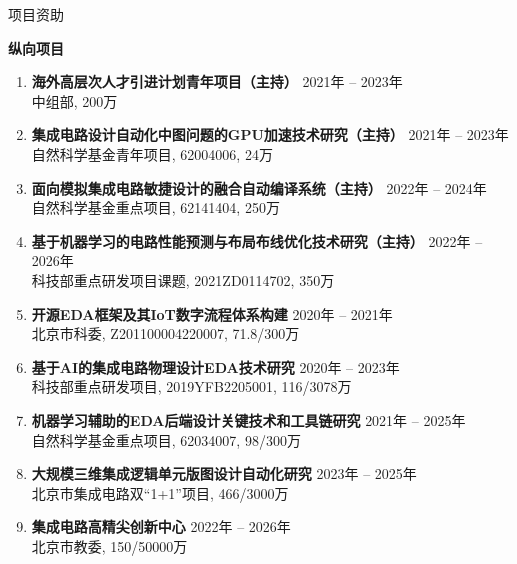 
\begin{rSection}{项目资助}


\textbf{纵向项目}
        
\begin{enumerate}[font=\normalfont]


\item
  {\bf 海外高层次人才引进计划青年项目（主持） }  \hfill{ 2021年 -- 2023年} \\
中组部, 200万

\item 
  {\bf 集成电路设计自动化中图问题的GPU加速技术研究（主持） } \hfill{ 2021年 -- 2023年} \\
自然科学基金青年项目, 62004006, 24万

\item 
{\bf 面向模拟集成电路敏捷设计的融合自动编译系统（主持） } \hfill{ 2022年 -- 2024年} \\
自然科学基金重点项目, 62141404, 250万

\item 
{\bf 基于机器学习的电路性能预测与布局布线优化技术研究（主持） } \hfill{ 2022年 -- 2026年} \\
科技部重点研发项目课题, 2021ZD0114702, 350万


\item 
{\bf 开源EDA框架及其IoT数字流程体系构建 } \hfill{ 2020年 -- 2021年} \\
北京市科委, Z201100004220007, 71.8/300万 %

\item 
{\bf 基于AI的集成电路物理设计EDA技术研究 } \hfill{ 2020年 -- 2023年} \\
科技部重点研发项目, 2019YFB2205001, 116/3078万 %

\item 
{\bf 机器学习辅助的EDA后端设计关键技术和工具链研究 } \hfill{ 2021年 -- 2025年} \\
自然科学基金重点项目, 62034007, 98/300万 %

\item 
{\bf 大规模三维集成逻辑单元版图设计自动化研究 } \hfill{ 2023年 -- 2025年} \\
北京市集成电路双``1+1''项目, 466/3000万 %

\item 
{\bf 集成电路高精尖创新中心 } \hfill{ 2022年 -- 2026年} \\
北京市教委, 150/50000万 %


\end{enumerate}
\end{rSection}
